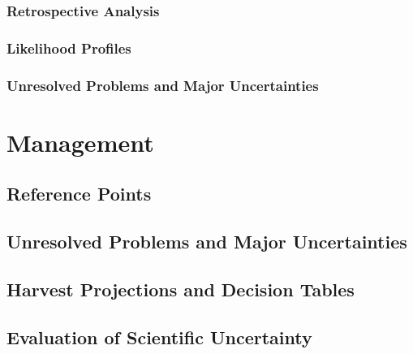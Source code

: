 \documentclass[11pt,
  english,
  letterpaper,
]{article}
\begin{document}
\hypertarget{retrospective-analysis}{%
\subsubsection{Retrospective Analysis}\label{retrospective-analysis}}

\hypertarget{likelihood-profiles}{%
\subsubsection{Likelihood Profiles}\label{likelihood-profiles}}

\hypertarget{unresolved-problems-and-major-uncertainties-1}{%
\subsubsection{Unresolved Problems and Major Uncertainties}\label{unresolved-problems-and-major-uncertainties-1}}

\hypertarget{management}{%
\section{Management}\label{management}}

\hypertarget{reference-points-2}{%
\subsection{Reference Points}\label{reference-points-2}}

\hypertarget{unresolved-problems-and-major-uncertainties-2}{%
\subsection{Unresolved Problems and Major Uncertainties}\label{unresolved-problems-and-major-uncertainties-2}}

\hypertarget{harvest-projections-and-decision-tables}{%
\subsection{Harvest Projections and Decision Tables}\label{harvest-projections-and-decision-tables}}

\hypertarget{evaluation-of-scientific-uncertainty}{%
\subsection{Evaluation of Scientific Uncertainty}\label{evaluation-of-scientific-uncertainty}}
\end{document}
